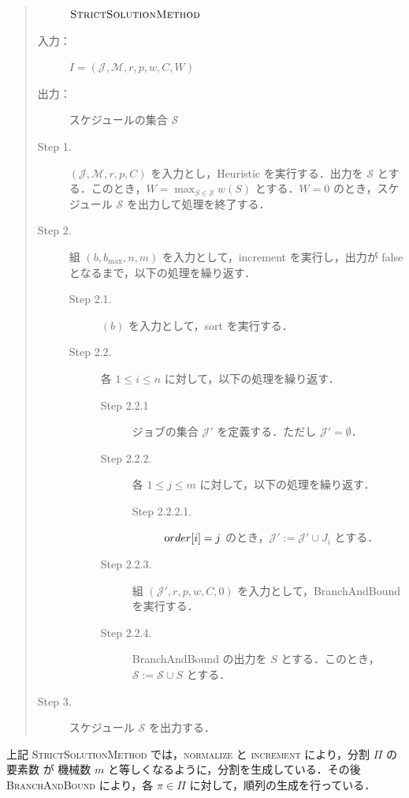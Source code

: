 \documentclass[12pt]{optlab-bachelor}
\begin{document}
\begin{quote}
  \begin{description}
    \item[] ${\mbox {\bf {\sc StrictSolutionMethod}}}$
    \item[入力：] $I = (\mathcal{J},\mathcal{M},r,p,w,C,W)$
    \item[出力：] スケジュールの集合 $\mathcal{S}$
  \end{description}
  \begin{description}
    \item[Step 1.] $(\mathcal{J},\mathcal{M},r,p,C)$ を入力とし，{\sc Heuristic} を実行する．出力を $\mathcal{S}$ とする．このとき，$W = {\displaystyle \max_{S \in \mathcal{S}}w(S)}$ とする．$W = 0$ のとき，スケジュール $\mathcal{S}$ を出力して処理を終了する．
    \item[Step 2.] 組 $(b,b_{\max},n,m)$ を入力として，{\sc increment} を実行し，出力が {\sc false} となるまで，以下の処理を繰り返す．
    \begin{description}
      \item[Step 2.1.] $(b)$ を入力として，{\sc sort} を実行する．
      \item[Step 2.2.] 各 $1 \le i \le n$ に対して，以下の処理を繰り返す．
      \begin{description}
        \item[Step 2.2.1] ジョブの集合 $\mathcal{J}'$ を定義する．ただし $\mathcal{J}' = \emptyset$．
        \item[Step 2.2.2.] 各 $1 \le j \le m$ に対して，以下の処理を繰り返す．
        \begin{description}
          \item[Step 2.2.2.1.] ${\mbox order}[i] = j$ のとき，$\mathcal{J}' :=\mathcal{J}' \cup J_i$ とする．
        \end{description}
        \item[Step 2.2.3.] 組 $(\mathcal{J}',r,p,w,C,0)$ を入力として，{\sc BranchAndBound} を実行する．
        \item[Step 2.2.4.] {\sc BranchAndBound} の出力を $S$ とする．このとき，$\mathcal{S} := \mathcal{S} \cup S$ とする．
      \end{description}
    \end{description}
    \item[Step 3.] スケジュール $\mathcal{S}$ を出力する．
  \end{description}
\end{quote}

上記 \textsc{StrictSolutionMethod} では，\textsc{normalize} と \textsc{increment} により，分割 $\Pi$ の要素数 が 機械数 $m$ と等しくなるように，分割を生成している．その後 \textsc{BranchAndBound} により，各 $\pi \in \Pi$ に対して，順列の生成を行っている．
\end{document}
